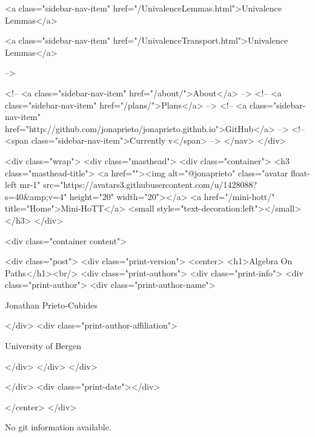       
    
      
        
          <a class="sidebar-nav-item" href="/UnivalenceLemmas.html">Univalence Lemmas</a>
        
      
    
      
        
          <a class="sidebar-nav-item" href="/UnivalenceTransport.html">Univalence Lemmas</a>
        
      
     -->

    <!-- <a class="sidebar-nav-item" href="/about/">About</a> -->
    <!-- <a class="sidebar-nav-item" href="/plans/">Plans</a> -->
    <!-- <a class="sidebar-nav-item" href="http://github.com/jonaprieto/jonaprieto.github.io">GitHub</a> -->
    <!-- <span class="sidebar-nav-item">Currently v</span> -->
  </nav>
</div>

    <div class="wrap">
      <div class="masthead">
        <div class="container">
          <h3 class="masthead-title">
            <a href=""><img alt="@jonaprieto" class="avatar float-left mr-1" src="https://avatars3.githubusercontent.com/u/1428088?s=40&amp;v=4" height="20" width="20"></a>
            <a href="/mini-hott/" title="Home">Mini-HoTT</a>
            <small style="text-decoration:left"></small>
          </h3>
        </div>
      
      <div class="container content">
        







<div class="post">
  <div class="print-version">
    <center>
      <h1>Algebra On Paths</h1><br/>
        <div class="print-authors">
          <div class="print-info">
            <div class="print-author">
              <div class="print-author-name">
                
                  Jonathan Prieto-Cubides
                
              </div>
              <div class="print-author-affiliation">
                
                  University of Bergen
                
                </div>
            </div>
          </div>
          
          
        </div>
        <div class="print-date"></div>
        
        
    </center>
  </div>

  
  No git information available.
  

